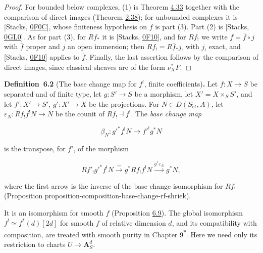 \documentclass[11pt]{article}
\newenvironment{bpstatement}[2]{\par\addvspace{0.6\baselineskip}\noindent\textbf{#1}#2\textbf{.}\enspace\ignorespaces}
  {\par\addvspace{0.4\baselineskip}}
\newcommand{\bpout}[1]{#1\textsuperscript{\hyperlink{bp-outside}{\ensuremath{\ast}}}}
\begin{document}
\begin{proof}[{Proof}]\label{bp518}%
For bounded below complexes, (1) is Theorem \hyperref[bp382]{4.33} together with the comparison of direct images (Theorem \hyperref[bp113]{2.38}); for unbounded complexes it is [Stacks, \href{https://stacks.math.columbia.edu/tag/0F0C}{0F0C}], whose finiteness hypothesis on \(f\) is part (3). Part (2) is [Stacks, \href{https://stacks.math.columbia.edu/tag/0GL0}{0GL0}]. As for part (3), for \(Rf_*\) it is [Stacks, \href{https://stacks.math.columbia.edu/tag/0F10}{0F10}], and for \(Rf_!\) we write \(f=\bar f\circ j\) with \(\bar f\) proper and \(j\) an open immersion; then \(Rf_!=R\bar f_*j_!\) with \(j_!\) exact, and [Stacks, \href{https://stacks.math.columbia.edu/tag/0F10}{0F10}] applies to \(\bar f\). Finally, the last assertion follows by the comparison of direct images, since classical sheaves are of the form \(\nu_X^*F\).
\end{proof}

\label{bp519}%
\begin{bpstatement}{Definition~6.2}{ (The base change map for $f^!$, finite coefficients)}
Let \(f:X\to S\) be separated and of finite type, let \(g:S'\to S\) be a morphism, let \(X'=X\times_SS'\), and let \(f':X'\to S'\), \(g':X'\to X\) be the projections. For \(N\in D(S_{\acute{e}t},A)\), let \(\varepsilon_N:Rf_!f^!N\to N\) be the counit of \(Rf_!\dashv f^!\). The \emph{base change map}

\[
\beta_N:g'^*f^!N\longrightarrow f'^!g^*N
\tag{6.1}
\]

is the transpose, for \(f'\), of the morphism

\[
Rf'_!g'^*f^!N
\xrightarrow{\ \sim\ }g^*Rf_!f^!N
\xrightarrow{g^*\varepsilon_N}g^*N,
\tag{6.2}
\]

where the first arrow is the inverse of the base change isomorphism for \(Rf_!\) (Proposition proposition-composition-base-change-rf-shriek).
\end{bpstatement}

\label{bp520}%
It is an isomorphism for smooth \(f\) (Proposition \hyperref[bp542]{6.9}). The global isomorphism \(f^!\simeq f^*(d)[2d]\) for smooth \(f\) of relative dimension \(d\), and its compatibility with composition, are treated with smooth purity in Chapter \bpout{9}. Here we need only its restriction to charts \(U\to\mathbf A^d_S\).
\end{document}
